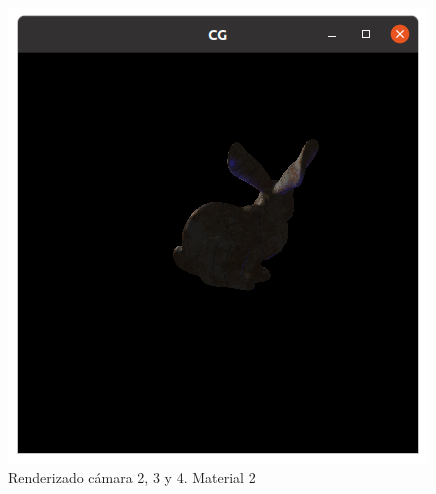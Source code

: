 \documentclass[12pt]{article}
\begin{document}
\begin{figure}[H]
\includegraphics[scale=0.4]{images/ej4.png}
\caption{Renderizado cámara 2, 3 y 4. Material 2}
\end{figure}





\end{document}
